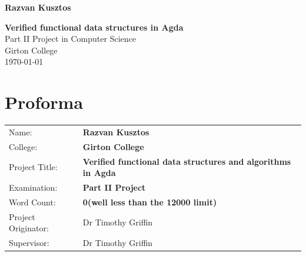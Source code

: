 \documentclass[12pt,twoside,notitlepage]{report}
\begin{document}





\pagestyle{empty}

\hfill{\LARGE \bf Razvan Kusztos}

\vspace*{60mm}
\begin{center}
\Huge
{\bf Verified functional data structures in Agda} \\
\vspace*{5mm}
Part II Project in Computer Science\\
\vspace*{5mm}
Girton College \\
\vspace*{5mm}
\today  %
\end{center}

\cleardoublepage


\linespread{1.5}



\setcounter{page}{1}
\pagestyle{plain}

\chapter*{Proforma}

{\large
\begin{tabular}{ll}
Name:               & \bf Razvan Kusztos                       \\
College:            & \bf Girton College                     \\
Project Title:      & \bf Verified functional data structures and algorithms in Agda \\
Examination:        & \bf Part II Project        \\
Word Count:         & \bf 0\footnotemark[1]
(well less than the 12000 limit) \\
Project Originator: & Dr Timothy Griffin                    \\
Supervisor:         & Dr Timothy Griffin                    \\
\end{tabular}
}
\end{document}
